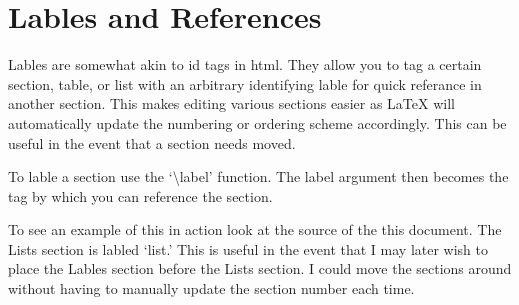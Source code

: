 \documentclass{article}
\begin{document}
\section{Lables and References\label{lables}}

Lables are somewhat akin to id tags in html. They allow you to tag a certain section, table, or list with an arbitrary identifying lable for quick referance in another section. This makes editing various sections easier as LaTeX will automatically update the numbering or ordering scheme accordingly. This can be useful in the event that a section needs moved.

To lable a section use the `\textbackslash label' function. The label argument then becomes the tag by which you can reference the section.   

To see an example of this in action look at the source of the this document. The Lists section is labled `list.' This is useful in the event that I may later wish to place the Lables section before the Lists section. I could move the sections around without having to manually update the section number each time. 
\end{document}
